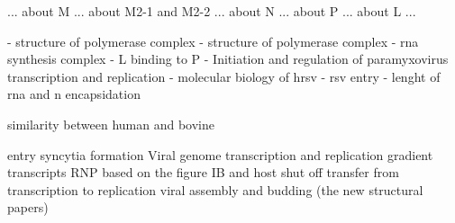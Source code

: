 























... about M 
... about M2-1 and M2-2 
... about N 
... about P 
... about L ...

\cite{Gilman2019StructureComplex} - structure of polymerase complex
\cite{Cao2020Cryo-EMPolymerase} - structure of polymerase complex
\cite{Cao2021StructuralComplexes} - rna synthesis complex
\cite{Cardone2021APhosphoprotein} - L binding to P
\cite{Noton2015InitiationReplication} - Initiation and regulation of paramyxovirus transcription and replication
\cite{Melero2006MolecularVirus} - molecular biology of hrsv
\cite{Battles2019RespiratoryIt} - rsv entry
\cite{Gonnin2022ImportanceVirus} - lenght of rna and n encapsidation

similarity between human and bovine

entry
syncytia formation
Viral genome transcription and replication 
gradient transcripts
RNP based on the figure
IB and host shut off
transfer from transcription to replication
viral assembly and budding (the new structural papers)

